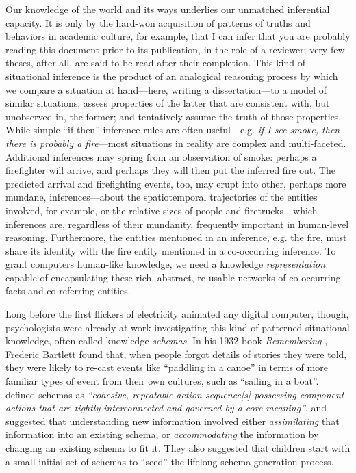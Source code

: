 Our knowledge of the world and its ways underlies our unmatched inferential capacity.
It is only by the hard-won acquisition of patterns of truths and behaviors in academic culture, for example, that I can infer that you are probably reading this document prior to its publication, in the role of a reviewer; very few theses, after all, are said to be read after their completion.
This kind of situational inference is the product of an analogical reasoning process by which we compare a situation at hand---here, writing a dissertation---to a model of similar situations; assess properties of the latter that are consistent with, but unobserved in, the former; and tentatively assume the truth of those properties.
While simple ``if-then'' inference rules are often useful---e.g. \textit{if I see smoke, then there is probably a fire}---most situations in reality are complex and multi-faceted. Additional inferences may spring from an observation of smoke: perhaps a firefighter will arrive, and perhaps they will then put the inferred fire out. The predicted arrival and firefighting events, too, may erupt into other, perhaps more mundane, inferences---about the spatiotemporal trajectories of the entities involved, for example, or the relative sizes of people and firetrucks---which inferences are, regardless of their mundanity, frequently important in human-level reasoning. Furthermore, the entities mentioned in an inference, e.g. the fire, must share its identity with the fire entity mentioned in a co-occurring inference. To grant computers human-like knowledge, we need a knowledge \textit{representation} capable of encapsulating these rich, abstract, re-usable networks of co-occurring facts and co-referring entities.

Long before the first flickers of electricity animated any digital computer, though, psychologists were already at work investigating this kind of patterned situational knowledge, often called knowledge \textit{schemas}.
In his 1932 book \textit{Remembering} \citep{bartlett1995remembering}, Frederic Bartlett found that, when people forgot details of stories they were told, they were likely to re-cast events like ``paddling in a canoe'' in terms of more familiar types of event from their own cultures, such as ``sailing in a boat''. \citet{piaget1952origins} defined schemas as \textit{``cohesive, repeatable action sequence[s] possessing component actions that are tightly interconnected and governed by a core meaning''}, and suggested that understanding new information involved either \textit{assimilating} that information into an existing schema, or \textit{accommodating} the information by changing an existing schema to fit it. They also suggested that children start with a small initial set of schemas to ``seed'' the lifelong schema generation process.

